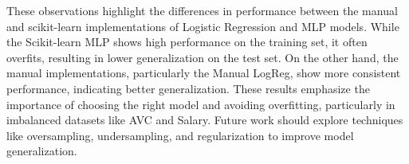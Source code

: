 \documentclass[a4paper,12pt]{article}
\begin{document}
These observations highlight the differences in performance between the manual and scikit-learn implementations of Logistic Regression and MLP models. While the Scikit-learn MLP shows high performance on the training set, it often overfits, resulting in lower generalization on the test set. On the other hand, the manual implementations, particularly the Manual LogReg, show more consistent performance, indicating better generalization. These results emphasize the importance of choosing the right model and avoiding overfitting, particularly in imbalanced datasets like AVC and Salary. Future work should explore techniques like oversampling, undersampling, and regularization to improve model generalization.
\end{document}
